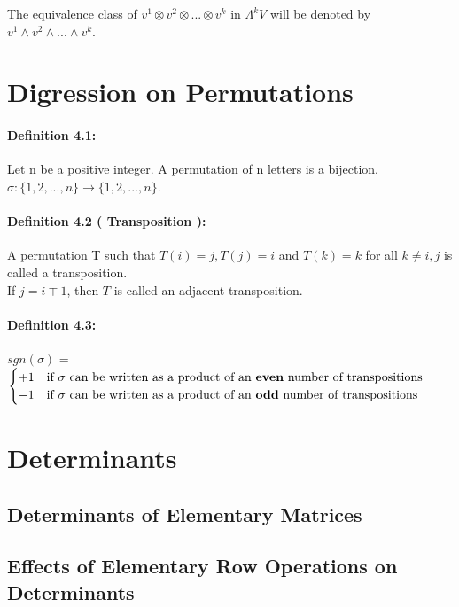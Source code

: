 \documentclass{article}
\begin{document}
The equivalence class of $v^1\otimes v^2\otimes...\otimes v^k$ in $\Lambda^k V$ will be denoted by $v^1\wedge v^2\wedge...\wedge v^k$.\\
\section{Digression on Permutations}
\paragraph{Definition 4.1:} Let n be a positive integer. A permutation of n letters is a bijection.  $\sigma:\{1,2,...,n\}\rightarrow \{1,2,...,n\}$.\\
\paragraph{Definition 4.2 ( Transposition ):}  A permutation T such that $T(i) = j, T(j) = i$ and $T(k) = k$ for all $k\neq i,j$ is called a transposition.\\
If $j= i\mp 1$, then $T$ is called an adjacent transposition.\\
\paragraph{Definition 4.3:} 
$sgn(\sigma)$ = 
$\begin{cases} 
       +1 & \text{if $\sigma$ can be written as a product of an \textbf{even} number of transpositions} \\ 
       -1 & \text{if $\sigma$ can be written as a product of an \textbf{odd} number of transpositions} 
   \end{cases}$ 

\section{Determinants}

\subsection{Determinants of Elementary Matrices}

\subsection{Effects of Elementary Row Operations on Determinants}
\end{document}
